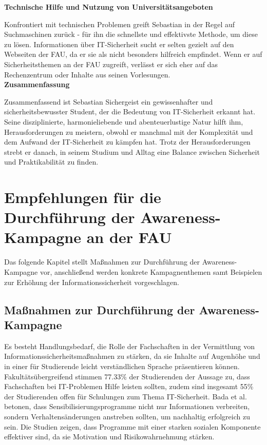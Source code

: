 \documentclass[german,report]{i1thesis}
\begin{document}
\textbf{Technische Hilfe und Nutzung von Universitätsangeboten}

Konfrontiert mit technischen Problemen greift Sebastian in der Regel auf Suchmaschinen zurück - für ihn die schnellste und effektivste Methode, um diese zu lösen. Informationen über IT-Sicherheit sucht er selten gezielt auf den Webseiten der FAU, da er sie als nicht besonders hilfreich empfindet. Wenn er auf Sicherheitsthemen an der FAU zugreift, verlässt er sich eher auf das Rechenzentrum oder Inhalte aus seinen Vorlesungen.\\

\textbf{Zusammenfassung}

Zusammenfassend ist Sebastian Sichergeist ein gewissenhafter und sicherheitsbewusster Student, der die Bedeutung von IT-Sicherheit erkannt hat. Seine disziplinierte, harmonieliebende und abenteuerlustige Natur hilft ihm, Herausforderungen zu meistern, obwohl er manchmal mit der Komplexität und dem Aufwand der IT-Sicherheit zu kämpfen hat. Trotz der Herausforderungen strebt er danach, in seinem Studium und Alltag eine Balance zwischen Sicherheit und Praktikabilität zu finden.

\newpage

\section{Empfehlungen für die Durchführung der Awareness-Kampagne an der FAU}
\label{sec}

Das folgende Kapitel stellt Maßnahmen zur Durchführung der Awareness-Kampagne vor, anschließend werden konkrete Kampagnenthemen samt Beispielen zur Erhöhung der Informationssicherheit vorgeschlagen.

\subsection{Maßnahmen zur Durchführung der Awareness-Kampagne}

Es besteht Handlungsbedarf, die Rolle der Fachschaften in der Vermittlung von Informationssicherheitsmaßnahmen zu stärken, da sie Inhalte auf Augenhöhe und in einer für Studierende leicht verständlichen Sprache präsentieren können. Fakultätsübergreifend stimmen 77.33\% der Studierenden der Aussage zu, dass Fachschaften bei IT-Problemen Hilfe leisten sollten, zudem sind insgesamt 55\% der Studierenden offen für Schulungen zum Thema IT-Sicherheit. Bada et al. \cite{bada2019cyber} betonen, dass Sensibilisierungsprogramme nicht nur Informationen verbreiten, sondern Verhaltensänderungen anstreben sollten, um nachhaltig erfolgreich zu sein. Die Studien zeigen, dass Programme mit einer starken sozialen Komponente effektiver sind, da sie Motivation und Risikowahrnehmung stärken.
\end{document}
